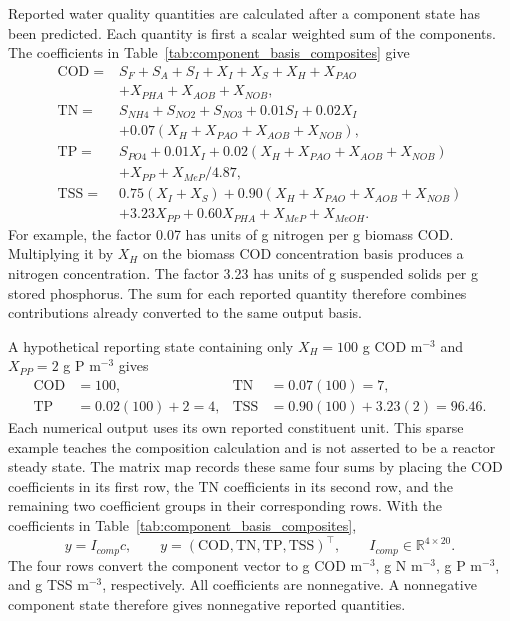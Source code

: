 Reported water quality quantities are calculated after a component state has been predicted. Each quantity is first a scalar weighted sum of the components. The coefficients in Table~\ref{tab:component_basis_composites} give
\[
\begin{aligned}
\mathrm{COD}={}&S_F+S_A+S_I+X_I+X_S+X_H+X_{PAO}\\
&+X_{PHA}+X_{AOB}+X_{NOB},\\[2pt]
\mathrm{TN}={}&S_{NH4}+S_{NO2}+S_{NO3}+0.01S_I+0.02X_I\\
&+0.07(X_H+X_{PAO}+X_{AOB}+X_{NOB}),\\[2pt]
\mathrm{TP}={}&S_{PO4}+0.01X_I+0.02(X_H+X_{PAO}+X_{AOB}+X_{NOB})\\
&+X_{PP}+X_{MeP}/4.87,\\[2pt]
\mathrm{TSS}={}&0.75(X_I+X_S)+0.90(X_H+X_{PAO}+X_{AOB}+X_{NOB})\\
&+3.23X_{PP}+0.60X_{PHA}+X_{MeP}+X_{MeOH}.
\end{aligned}
\]
For example, the factor 0.07 has units of g nitrogen per g biomass COD. Multiplying it by $X_H$ on the biomass COD concentration basis produces a nitrogen concentration. The factor 3.23 has units of g suspended solids per g stored phosphorus. The sum for each reported quantity therefore combines contributions already converted to the same output basis.

A hypothetical reporting state containing only $X_H=100$ g COD m$^{-3}$ and $X_{PP}=2$ g P m$^{-3}$ gives
\[
\begin{aligned}
\mathrm{COD}&=100, &\mathrm{TN}&=0.07(100)=7,\\
\mathrm{TP}&=0.02(100)+2=4,
&\mathrm{TSS}&=0.90(100)+3.23(2)=96.46.
\end{aligned}
\]
Each numerical output uses its own reported constituent unit. This sparse example teaches the composition calculation and is not asserted to be a reactor steady state. The matrix map records these same four sums by placing the COD coefficients in its first row, the TN coefficients in its second row, and the remaining two coefficient groups in their corresponding rows. With the coefficients in Table~\ref{tab:component_basis_composites},
\begin{equation}
y=I_{comp}c,\qquad
y=(\mathrm{COD},\mathrm{TN},\mathrm{TP},\mathrm{TSS})^\top,\qquad
I_{comp}\in\mathbb{R}^{4\times20}.
\label{eq:component_composite_map}
\end{equation}
The four rows convert the component vector to g COD m$^{-3}$, g N m$^{-3}$, g P m$^{-3}$, and g TSS m$^{-3}$, respectively. All coefficients are nonnegative. A nonnegative component state therefore gives nonnegative reported quantities.

